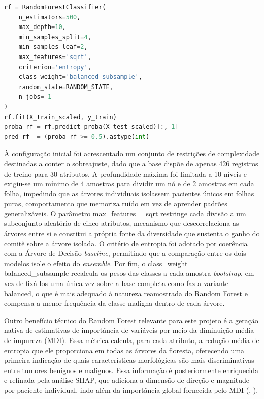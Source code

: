 \documentclass[
    12pt
    ,oneside
    ,a4paper
    ,chapter=TITLE
    ,section=TITLE
    ,sumario=abnt-6027-2012
    ,english,brazil]{abntex2} %
\begin{document}
\begin{codigo}[htb]
\begin{lstlisting}[language=Python]
rf = RandomForestClassifier(
    n_estimators=500,
    max_depth=10,
    min_samples_split=4,
    min_samples_leaf=2,
    max_features='sqrt',
    criterion='entropy',
    class_weight='balanced_subsample',
    random_state=RANDOM_STATE,
    n_jobs=-1
)
rf.fit(X_train_scaled, y_train)
proba_rf = rf.predict_proba(X_test_scaled)[:, 1]
pred_rf  = (proba_rf >= 0.5).astype(int)
\end{lstlisting}
\fonteautor
\end{codigo}

À configuração inicial foi acrescentado um conjunto de restrições de
complexidade destinadas a conter o sobreajuste, dado que a base dispõe de
apenas 426 registros de treino para 30 atributos. A profundidade máxima foi
limitada a 10 níveis e exigiu-se um mínimo de 4 amostras para dividir um nó e
de 2 amostras em cada folha, impedindo que as árvores individuais isolassem
pacientes únicos em folhas puras, comportamento que memoriza ruído em vez de
aprender padrões generalizáveis. O parâmetro max\_features = sqrt restringe
cada divisão a um subconjunto aleatório de cinco atributos,
mecanismo que descorrelaciona as árvores entre si e constitui a própria fonte
da diversidade que sustenta o ganho do comitê sobre a árvore isolada. O
critério de entropia foi adotado por coerência com a Árvore de Decisão
\textit{baseline}, permitindo que a comparação entre os dois modelos isole o
efeito do \textit{ensemble}. Por fim, o class\_weight =
balanced\_subsample recalcula os pesos das classes a cada amostra
\textit{bootstrap}, em vez de fixá-los uma única vez sobre a base completa como
faz a variante balanced, o que é mais adequado à natureza reamostrada do
Random Forest e compensa a menor frequência da classe maligna dentro de cada
árvore.

Outro benefício técnico do Random Forest relevante para este projeto é a
geração nativa de estimativas de importância de variáveis por meio da
diminuição média de impureza (MDI). Essa métrica calcula, para cada atributo,
a redução média de entropia que ele proporciona em todas as árvores da floresta,
oferecendo uma primeira indicação de quais características morfológicas são
mais discriminativas entre tumores benignos e malignos. Essa informação é
posteriormente enriquecida e refinada pela análise SHAP, que adiciona a
dimensão de direção e magnitude por paciente individual, indo além da
importância global fornecida pelo MDI (,
\citeyear{Lundberg2017}).
\end{document}
